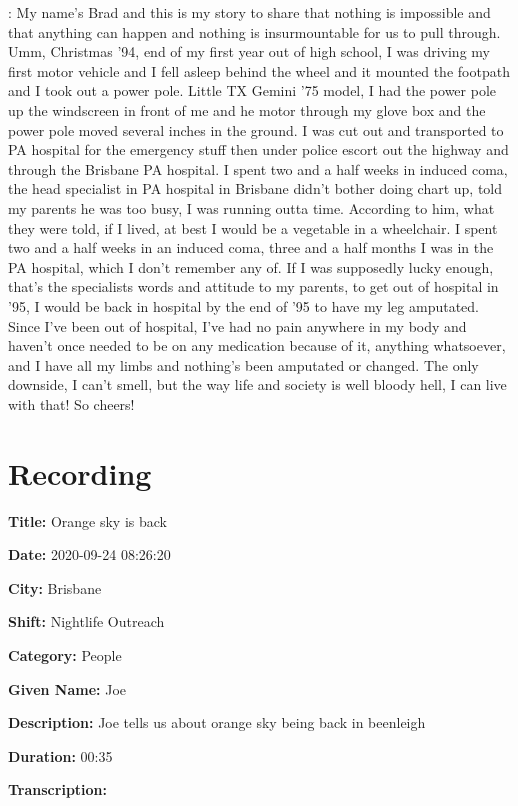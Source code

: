 {\begin{drama}
    \bradspeaks: My name's Brad and this is my story to share that nothing is impossible and that anything can happen and nothing is insurmountable for us to pull through. Umm, Christmas '94, end of my first year out of high school, I was driving my first motor vehicle and I fell asleep behind the wheel and it mounted the footpath and I took out a power pole. Little TX Gemini '75 model, I had the power pole up the windscreen in front of me and he motor through my glove box and the power pole moved several inches in the ground. I was cut out and transported to PA hospital for the emergency stuff then under police escort out the highway and through the Brisbane PA hospital. I spent two and a half weeks in induced coma, the head specialist in PA hospital in Brisbane didn't bother doing chart up, told my parents he was too busy, I was running outta time. According to him, what they were told, if I lived, at best I would be a vegetable in a wheelchair. I spent two and a half weeks in an induced coma, three and a half months I was in the PA hospital, which I don't remember any of. If I was supposedly lucky enough, that's the specialists words and attitude to my parents, to get out of hospital in '95, I would be back in hospital by the end of '95 to have my leg amputated. Since I've been out of hospital, I've had no pain anywhere in my body and haven't once needed to be on any medication because of it, anything whatsoever, and I have all my limbs and nothing's been amputated or changed. The only downside, I can't smell, but the way life and society is well bloody hell, I can live with that! So cheers!
\end{drama}

\tocless\section{Recording }

\textbf{Title:} Orange sky is back

\textbf{Date:} 2020-09-24 08:26:20

\textbf{City:} Brisbane

\textbf{Shift:} Nightlife Outreach

\textbf{Category:} People

\textbf{Given Name:} Joe

\textbf{Description:} Joe tells us about orange sky being back in beenleigh

\textbf{Duration:} 00:35

\textbf{Transcription:}

}
